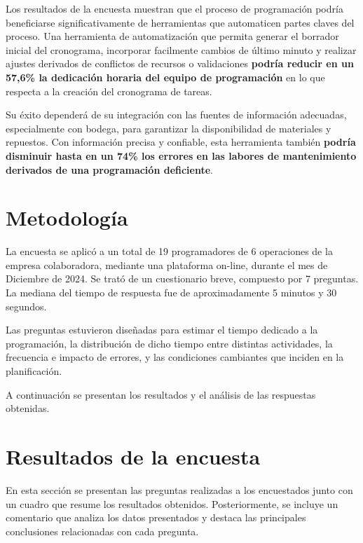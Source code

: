 \documentclass{article}
\begin{document}
\begin{appendix}
    Los resultados de la encuesta muestran que el proceso de programación podría beneficiarse significativamente de herramientas que automaticen partes claves del proceso. Una herramienta de automatización que permita generar el borrador inicial del cronograma, incorporar facilmente cambios de último minuto y realizar ajustes derivados de conflictos de recursos o validaciones \textbf{podría reducir en un 57,6\% la dedicación horaria del equipo de programación} en lo que respecta a la creación del cronograma de tareas. 
    
    Su éxito dependerá de su integración con las fuentes de información adecuadas, especialmente con bodega, para garantizar la disponibilidad de materiales y repuestos. Con información precisa y confiable, esta herramienta también \textbf{podría disminuir hasta en un 74\% los errores en las labores de mantenimiento derivados de una programación deficiente}.
    
    \section*{Metodología}
    
    La encuesta se aplicó a un total de 19 programadores de 6 operaciones de la empresa colaboradora, mediante una plataforma on-line, durante el mes de Diciembre de 2024. Se trató de un cuestionario breve, compuesto por 7 preguntas. La mediana del tiempo de respuesta fue de aproximadamente 5 minutos y 30 segundos. 
    
    Las preguntas estuvieron diseñadas para estimar el tiempo dedicado a la programación, la distribución de dicho tiempo entre distintas actividades, la frecuencia e impacto de errores, y las condiciones cambiantes que inciden en la planificación.
    
    A continuación se presentan los resultados y el análisis de las respuestas obtenidas.
    
    \section*{Resultados de la encuesta}
    
    En esta sección se presentan las preguntas realizadas a los encuestados junto con un cuadro que resume los resultados obtenidos. Posteriormente, se incluye un comentario que analiza los datos presentados y destaca las principales conclusiones relacionadas con cada pregunta.
    
    \vspace{.5em}

\end{appendix}
\end{document}
